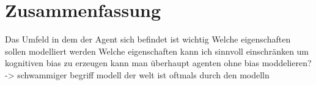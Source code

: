\chapter{Zusammenfassung}
Das Umfeld in dem der Agent sich befindet ist wichtig
Welche eigenschaften sollen modelliert werden
Welche eigenschaften kann ich sinnvoll einschränken um kognitiven bias zu erzeugen
kann man überhaupt agenten ohne bias moddelieren? -> schwammiger begriff modell der welt ist oftmals durch den modelln